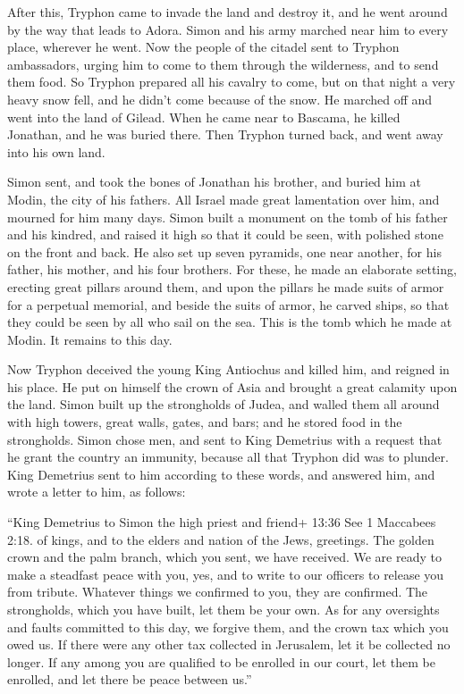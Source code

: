 After this, Tryphon came to invade the land and destroy
it, and he went around by the way that leads to Adora. Simon and his
army marched near him to every place, wherever he went. 
Now the people of the citadel sent to Tryphon ambassadors, urging him to
come to them through the wilderness, and to send them food.
 So Tryphon prepared all his cavalry to come, but on that
night a very heavy snow fell, and he didn't come because of the snow. He
marched off and went into the land of Gilead.  When he came
near to Bascama, he killed Jonathan, and he was buried there.
 Then Tryphon turned back, and went away into his own land.

 Simon sent, and took the bones of Jonathan his brother,
and buried him at Modin, the city of his fathers.  All
Israel made great lamentation over him, and mourned for him many days.
 Simon built a monument on the tomb of his father and his
kindred, and raised it high so that it could be seen, with polished
stone on the front and back.  He also set up seven
pyramids, one near another, for his father, his mother, and his four
brothers.  For these, he made an elaborate setting,
erecting great pillars around them, and upon the pillars he made suits
of armor for a perpetual memorial, and beside the suits of armor, he
carved ships, so that they could be seen by all who sail on the sea.
 This is the tomb which he made at Modin. It remains to
this day.

 Now Tryphon deceived the young King Antiochus and killed
him,  and reigned in his place. He put on himself the crown
of Asia and brought a great calamity upon the land.  Simon
built up the strongholds of Judea, and walled them all around with high
towers, great walls, gates, and bars; and he stored food in the
strongholds.  Simon chose men, and sent to King Demetrius
with a request that he grant the country an immunity, because all that
Tryphon did was to plunder.  King Demetrius sent to him
according to these words, and answered him, and wrote a letter to him,
as follows:

 ``King Demetrius to Simon the high priest and friend+
13:36 See 1 Maccabees 2:18. of kings, and to the elders and nation of
the Jews, greetings.  The golden crown and the palm branch,
which you sent, we have received. We are ready to make a steadfast peace
with you, yes, and to write to our officers to release you from tribute.
 Whatever things we confirmed to you, they are confirmed.
The strongholds, which you have built, let them be your own.
 As for any oversights and faults committed to this day, we
forgive them, and the crown tax which you owed us. If there were any
other tax collected in Jerusalem, let it be collected no longer.
 If any among you are qualified to be enrolled in our
court, let them be enrolled, and let there be peace between us.''

